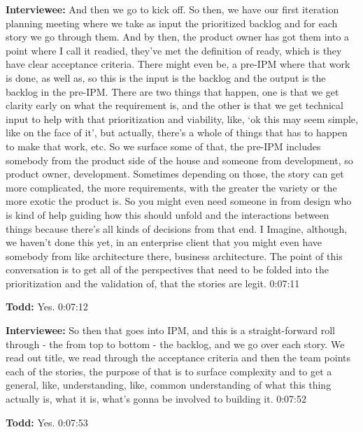 \textbf{Interviewee:}   And then we go to kick off.  So then, we have our first iteration planning meeting where we take as input the prioritized backlog and for each story we go through them.  And by then, the product owner has got them into a point where I call it readied, they've met the definition of ready, which is they have clear acceptance criteria.  There might even be, a pre-IPM where that work is done, as well as, so this is the input is the backlog and the output is the backlog in the pre-IPM.  There are two things that happen, one is that we get clarity early on what the requirement is, and the other is that we get technical input to help with that prioritization and viability, like, ‘ok this may seem simple, like on the face of it', but actually, there's a whole of things that has to happen to make that work, etc. So we surface some of that, the pre-IPM includes somebody from the product side of the house and someone from development, so product owner, development.  Sometimes depending on those, the story can get more complicated, the more requirements, with the greater the variety or the more exotic the product is.  So you might even need someone in from design who is kind of help guiding how this should unfold and the interactions between things because there's all kinds of decisions from that end.  I Imagine, although, we haven't done this yet, in an enterprise client that you might even have somebody from like architecture there, business architecture.  The point of this conversation is to get all of the perspectives that need to be folded into the prioritization and the validation of, that the stories are legit.  0:07:11

\textbf{Todd:}  	Yes.  0:07:12

\textbf{Interviewee:}  	So then that goes into IPM, and this is a straight-forward roll through - the from top to bottom - the backlog, and we go over each story.  We read out title, we read through the acceptance criteria and then the team points each of the stories, the purpose of that is to surface complexity and to get a general, like, understanding, like, common understanding of what this thing actually is, what it is, what's gonna be involved to building it.  0:07:52

\textbf{Todd:}  	Yes.  0:07:53

